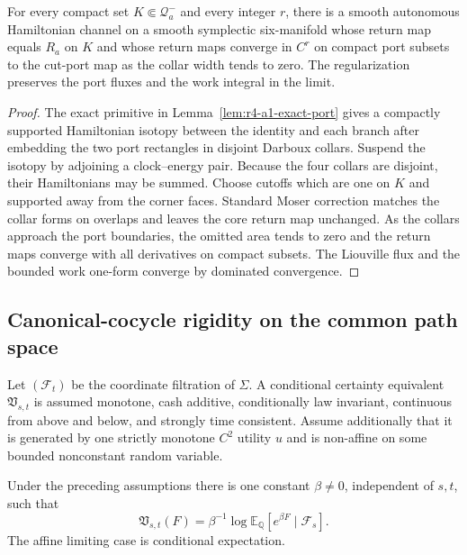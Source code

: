 \begin{theorem}
\label{thm:r4-a1-collar}
For every compact set \(K\Subset\mathcal Q_a^-\) and every integer \(r\),
there is a smooth autonomous Hamiltonian channel on a smooth symplectic
six-manifold whose return map equals \(R_a\) on \(K\) and whose return maps
converge in \(C^r\) on compact port subsets to the cut-port map as the collar
width tends to zero.  The regularization preserves the port fluxes and the
work integral in the limit.
\end{theorem}

\begin{proof}
The exact primitive in Lemma~\ref{lem:r4-a1-exact-port} gives a compactly
supported Hamiltonian isotopy between the identity and each branch after
embedding the two port rectangles in disjoint Darboux collars.  Suspend the
isotopy by adjoining a clock--energy pair.  Because the four collars are
disjoint, their Hamiltonians may be summed.  Choose cutoffs which are one on
\(K\) and supported away from the corner faces.  Standard Moser correction
matches the collar forms on overlaps and leaves the core return map unchanged.
As the collars approach the port boundaries, the omitted area tends to zero
and the return maps converge with all derivatives on compact subsets.  The
Liouville flux and the bounded work one-form converge by dominated
convergence.
\end{proof}

\subsection{Canonical-cocycle rigidity on the common path space}

Let \((\mathcal F_t)\) be the coordinate filtration of \(\Sigma\).  A
conditional certainty equivalent \(\mathfrak V_{s,t}\) is assumed monotone,
cash additive, conditionally law invariant, continuous from above and below,
and strongly time consistent.  Assume additionally that it is generated by
one strictly monotone \(C^2\) utility \(u\) and is non-affine on some bounded
nonconstant random variable.

\begin{lemma}
\label{lem:r4-a1-kn}
Under the preceding assumptions there is one constant \(\beta\ne0\),
independent of \(s,t\), such that
\[
 \mathfrak V_{s,t}(F)
 =\beta^{-1}\log
 \mathbb E_{\mathbb Q}[e^{\beta F}\mid\mathcal F_s].
\]
The affine limiting case is conditional expectation.
\end{lemma}

